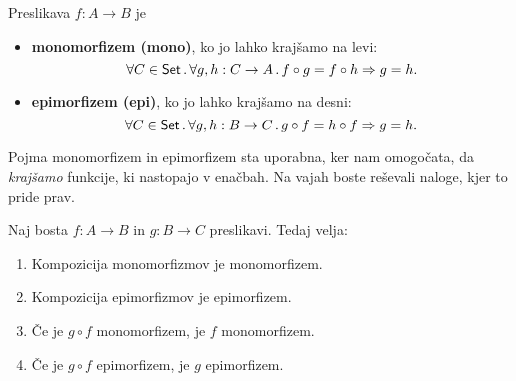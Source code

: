 \begin{definicija}
  Preslikava $f : A \to B$ je
  \begin{itemize}
  \item \textbf{monomorfizem (mono)}, ko jo lahko krajšamo na levi:
    \begin{equation*}
      \forall C \in \mathsf{Set} \,.\, \forall g, h : C \to A \,.\, f \circ g = f \circ h \Rightarrow g = h.
    \end{equation*}

   \item \textbf{epimorfizem (epi)}, ko jo lahko krajšamo na desni:
     \begin{equation*}
      \forall C \in \mathsf{Set} \,.\, \forall g, h : B \to C \,.\, g \circ f = h \circ f \Rightarrow g = h.
    \end{equation*}
  \end{itemize}
\end{definicija}

Pojma monomorfizem in epimorfizem sta uporabna, ker nam omogočata, da \emph{krajšamo} funkcije, ki nastopajo v enačbah. Na vajah boste reševali naloge, kjer to pride prav.

\begin{izrek}
  \label{izr:epi-mono-comp}
  Naj bosta $f : A \to B$ in $g : B \to C$ preslikavi. Tedaj velja:
  \begin{enumerate}
  \item Kompozicija monomorfizmov je monomorfizem.
  \item Kompozicija epimorfizmov je epimorfizem.
  \item Če je $g \circ f$ monomorfizem, je $f$ monomorfizem.
  \item Če je $g \circ f$ epimorfizem, je $g$ epimorfizem.
  \end{enumerate}
\end{izrek}

